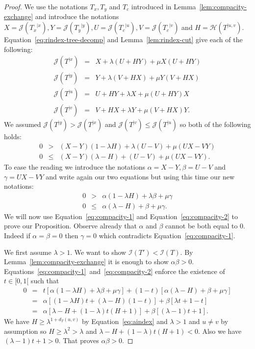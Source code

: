 \documentclass[11 pt]{modarticle}
\newcommand{\distance}[3]{d_{#3}(#1,#2)}
\newcommand{\rtree}[2]{{#1}^{\lvert #2}}
\newcommand{\indexsymbol}{\mathcal{I}}
\newcommand{\tindex}[1]{\indexsymbol(#1)}
\newcommand{\rindexsymbol}{\mathcal{J}}
\newcommand{\rindex}[2]{\rindexsymbol(\rtree{#2}{#1})}
\newcommand{\aindexsymbol}{\mathcal{H}}
\newcommand{\aindex}[3]{\aindexsymbol(\rtree{#3}{#1, #2})}
\begin{document}
\begin{proof}
We use the notations $T_x, T_y$ and $T_c$ introduced in Lemma~\ref{lem:compacity-exchange} and introduce the notations $X = \rindex{x}{T_x}, Y = \rindex{y}{T_y}, U = \rindex{u}{T_c}, V = \rindex{v}{T_c}$ and $H = \aindex{u}{v}{T}$. Equation~\eqref{eq:rindex-tree-decomp} and Lemma~\ref{lem:rindex-cut} give each of the following:
\begin{eqnarray*}
	\rindex{x}{T} & = & X + \lambda (U + HY) + \mu X (U + HY) \\
	\rindex{y}{T} & = & Y + \lambda (V + HX) + \mu Y (V + HX) \\
	\rindex{u}{T} & = & U + HY + \lambda X + \mu (U + HY) X \\
	\rindex{v}{T} & = & V + HX + \lambda Y + \mu (V + HX) Y.
\end{eqnarray*}
We assumed $\rindex{y}{T} > \rindex{x}{T}$ and $\rindex{v}{T} \leq \rindex{u}{T}$ so both of the following holds:
\begin{eqnarray*}
	0 & > & (X - Y)(1 - \lambda H) + \lambda (U - V) + \mu (UX - VY) \\
	0 & \leq & (X - Y)(\lambda - H) + (U - V) + \mu (UX - VY).
\end{eqnarray*}
To ease the reading we introduce the notations $\alpha = X - Y, \beta = U - V$ and $\gamma = UX - VY$ and write again our two equations but using this time our new notations:
\begin{eqnarray}
	0 & > & \alpha (1 - \lambda H) + \lambda \beta + \mu \gamma \label{eq:compacity-1} \\
	0 & \leq & \alpha(\lambda - H) + \beta + \mu \gamma. \label{eq:compacity-2}
\end{eqnarray}
We will now use Equation~\eqref{eq:compacity-1} and Equation~\eqref{eq:compacity-2} to prove our Proposition. Observe already that $\alpha$ and $\beta$ cannot be both equal to $0$. Indeed if $\alpha = \beta = 0$ then $\gamma = 0$ which contradicts Equation~\eqref{eq:compacity-1}.


We first assume $\lambda > 1$. We want to show $\tindex{T'} < \tindex{T}$. By Lemma~\ref{lem:compacity-exchange} it is enough to show $\alpha \beta > 0$.  Equations~\eqref{eq:compacity-1}~and~\eqref{eq:compacity-2} enforce the existence of $t \in [0,1[$ such that
\begin{eqnarray*}
	0 & = & t [\alpha (1 - \lambda H) + \lambda \beta + \mu \gamma] + (1 - t) [\alpha(\lambda - H) + \beta + \mu \gamma] \\
	& = & \alpha [(1 - \lambda H)t + (\lambda - H)(1 - t)] + \beta [\lambda t + 1 - t] \\
	& = & \alpha [\lambda - H + (1 - \lambda)t(H+1)] + \beta [(\lambda - 1) t + 1].
\end{eqnarray*}
We have $H \geq \lambda^{1 + \distance{u}{v}{T}}$ by Equation~\eqref{eq:aindex} and $\lambda > 1$ and $u \neq v$ by assumption so $H \geq \lambda^2 > \lambda$ and $\lambda - H + (1 - \lambda)t(H+1) < 0$.  Also we have $(\lambda - 1) t + 1 > 0$. That proves $\alpha \beta > 0$.


\end{proof}
\end{document}
